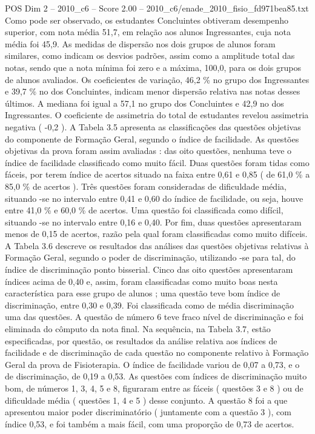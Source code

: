 \begin{textsample}{POS Dim 2 – 2010\_c6 – Score 2.00 – 2010\_c6/enade\_2010\_fisio\_fd971bea85.txt}
Como pode ser observado, os estudantes Concluintes obtiveram desempenho superior, com nota média 51,7, em relação aos alunos Ingressantes, cuja nota média foi 45,9.
As medidas de dispersão nos dois grupos de alunos foram similares, como indicam os desvios padrões, assim como a amplitude total das notas, sendo que a nota mínima foi zero e a máxima, 100,0, para os dois grupos de alunos avaliados.
Os coeficientes de variação, 46,2 \% no grupo dos Ingressantes e 39,7 \% no dos Concluintes, indicam menor dispersão relativa nas notas desses últimos.
A mediana foi igual a 57,1 no grupo dos Concluintes e 42,9 no dos Ingressantes.
O coeficiente de assimetria do total de estudantes revelou assimetria negativa ( -0,2 ).
A Tabela 3.5 apresenta as classificações das questões objetivas do componente de Formação Geral, segundo o índice de facilidade.
As questões objetivas da prova foram assim avaliadas : das oito questões, nenhuma teve o índice de facilidade classificado como muito fácil.
Duas questões foram tidas como fáceis, por terem índice de acertos situado na faixa entre 0,61 e 0,85 ( de 61,0 \% a 85,0 \% de acertos ).
Três questões foram consideradas de dificuldade média, situando -se no intervalo entre 0,41 e 0,60 do índice de facilidade, ou seja, houve entre 41,0 \% e 60,0 \% de acertos.
Uma questão foi classificada como difícil, situando -se no intervalo entre 0,16 e 0,40.
Por fim, duas questões apresentaram menos de 0,15 de acertos, razão pela qual foram classificadas como muito difíceis.
A Tabela 3.6 descreve os resultados das análises das questões objetivas relativas à Formação Geral, segundo o poder de discriminação, utilizando -se para tal, do índice de discriminação ponto bisserial.
Cinco das oito questões apresentaram índices acima de 0,40 e, assim, foram classificadas como muito boas nesta característica para esse grupo de alunos ; uma questão teve bom índice de discriminação, entre 0,30 e 0,39.
Foi classificada como de média discriminação uma das questões.
A questão de número 6 teve fraco nível de discriminação e foi eliminada do cômputo da nota final.
Na sequência, na Tabela 3.7, estão especificadas, por questão, os resultados da análise relativa aos índices de facilidade e de discriminação de cada questão no componente relativo à Formação Geral da prova de Fisioterapia.
O índice de facilidade variou de 0,07 a 0,73, e o de discriminação, de 0,19 a 0,53.
As questões com índices de discriminação muito bom, de números 1, 3, 4, 5 e 8, figuraram entre as fáceis ( questões 3 e 8 ) ou de dificuldade média ( questões 1, 4 e 5 ) desse conjunto.
A questão 8 foi a que apresentou maior poder discriminatório ( juntamente com a questão 3 ), com índice 0,53, e foi também a mais fácil, com uma proporção de 0,73 de acertos.

\end{textsample}
